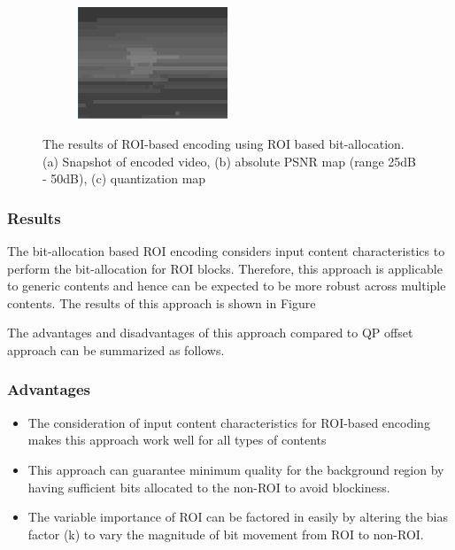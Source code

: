 \documentclass[11pt]{article} %
\begin{document}
\begin{figure}
\begin{subfigure}[t]{\textwidth}
		\centering
		\includegraphics[width=0.49\textwidth]{RC_bit_allocation/Paul250kbps_ROI_bit_alloc_quant.png}
		\caption{}
		\label{fig:ROI bit-allocation result quant}
	\end{subfigure}
	\caption{The results of ROI-based encoding using ROI based bit-allocation.(a) Snapshot of encoded video, (b) absolute PSNR map (range 25dB - 50dB), (c) quantization map}
	\label{fig:ROI bit-allocation result}
\end{figure}
\subsubsection{Results}
The bit-allocation based ROI encoding considers input content characteristics to perform the bit-allocation for ROI blocks. Therefore, this approach is applicable to generic contents and hence can be expected to be more robust across multiple contents. The results of this approach is shown in Figure 

The advantages and disadvantages of this approach compared to QP offset approach can be summarized as follows.
\subsubsection*{Advantages}
\begin{itemize}
\item The consideration of input content characteristics for ROI-based encoding makes this approach work well for all types of contents
\item This approach can guarantee minimum quality for the background region by having sufficient bits allocated to the non-ROI to avoid blockiness.
\item The variable importance of ROI can be factored in easily by altering the bias factor (k) to vary the magnitude of bit movement from ROI to non-ROI.
\end{itemize}
\end{document}
